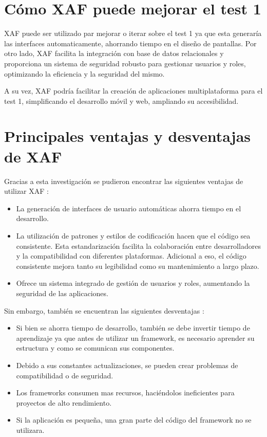 \documentclass{article}
\begin{document}
\section{Cómo XAF puede mejorar el test 1}
XAF puede ser utilizado par mejorar o iterar sobre el test 1 ya que esta generaría las interfaces automaticamente, ahorrando tiempo en el diseño de pantallas. Por otro lado, XAF facilita la integración con base de datos relacionales y proporciona un sistema de seguridad robusto para gestionar usuarios y roles, optimizando la eficiencia y la seguridad del mismo. \cite{devexpress}  

A su vez, XAF podría facilitar la creación de aplicaciones multiplataforma para el test 1, simplificando el desarrollo móvil y web, ampliando su accesibilidad.  \cite{polyxer2024}

\section{Principales ventajas y desventajas de XAF}
Gracias a esta investigación se pudieron encontrar las siguientes ventajas de utilizar XAF \cite{programacionproXAF}:
    \begin{itemize}
        \item La generación de interfaces de usuario automáticas ahorra tiempo en el desarrollo.
        \item La utilización de patrones y estilos de codificación hacen que el código sea consistente. Esta estandarización facilita la colaboración entre desarrolladores y la compatibilidad con diferentes plataformas. Adicional a eso, el código consistente mejora tanto su legibilidad como su mantenimiento a largo plazo.  
        \item Ofrece un sistema integrado de gestión de usuarios y roles, aumentando la seguridad de las aplicaciones.
    \end{itemize}
    
Sin embargo, también se encuentran las siguientes desventajas  \cite{tithink2018}: 
    \begin{itemize}
        \item Si bien se ahorra tiempo de desarrollo, también se debe invertir tiempo de aprendizaje ya que antes de utilizar un framework, es necesario aprender su estructura y como se comunican sus componentes.
        \item Debido a sus constantes actualizaciones, se pueden crear problemas de compatibilidad o de seguridad.
        \item Los frameworks consumen mas recursos, haciéndolos ineficientes para proyectos de alto rendimiento.
        \item Si la aplicación es pequeña, una gran parte del código del framework no se utilizara.
    \end{itemize}
    
\end{document}
